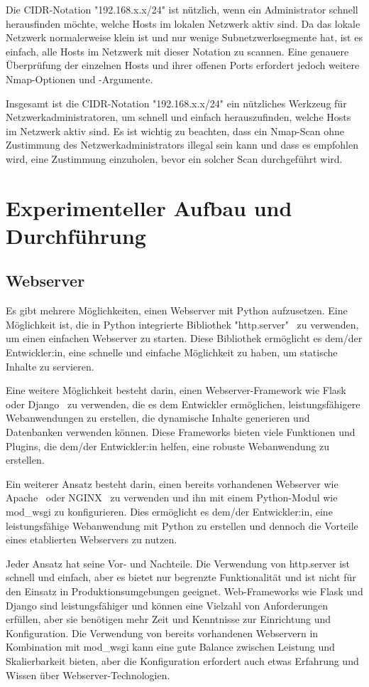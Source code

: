 \documentclass[12pt]{article}
\begin{document}
Die CIDR-Notation "192.168.x.x/24" ist nützlich, wenn ein Administrator schnell herausfinden möchte, welche Hosts im lokalen Netzwerk aktiv sind. Da das lokale Netzwerk normalerweise klein ist und nur wenige Subnetzwerksegmente hat, ist es einfach, alle Hosts im Netzwerk mit dieser Notation zu scannen. Eine genauere Überprüfung der einzelnen Hosts und ihrer offenen Ports erfordert jedoch weitere Nmap-Optionen und -Argumente.

Insgesamt ist die CIDR-Notation "192.168.x.x/24" ein nützliches Werkzeug für Netzwerkadministratoren, um schnell und einfach herauszufinden, welche Hosts im Netzwerk aktiv sind. Es ist wichtig zu beachten, dass ein Nmap-Scan ohne Zustimmung des Netzwerkadministrators illegal sein kann und dass es empfohlen wird, eine Zustimmung einzuholen, bevor ein solcher Scan durchgeführt wird.

\newpage
\section{Experimenteller Aufbau und Durchf\"uhrung}
\subsection{Webserver}

Es gibt mehrere Möglichkeiten, einen Webserver mit Python aufzusetzen. Eine Möglichkeit ist, die in Python integrierte Bibliothek "http.server"~\cite{http} zu verwenden, um einen einfachen Webserver zu starten. Diese Bibliothek ermöglicht es dem/der Entwickler:in, eine schnelle und einfache Möglichkeit zu haben, um statische Inhalte zu servieren.

Eine weitere Möglichkeit besteht darin, einen Webserver-Framework wie Flask~\cite{flask} oder Django~\cite{django} zu verwenden, die es dem Entwickler ermöglichen, leistungsfähigere Webanwendungen zu erstellen, die dynamische Inhalte generieren und Datenbanken verwenden können. Diese Frameworks bieten viele Funktionen und Plugins, die dem/der Entwickler:in helfen, eine robuste Webanwendung zu erstellen.

Ein weiterer Ansatz besteht darin, einen bereits vorhandenen Webserver wie Apache~\cite{apache} oder NGINX~\cite{nginx} zu verwenden und ihn mit einem Python-Modul wie mod\_wsgi zu konfigurieren. Dies ermöglicht es dem/der Entwickler:in, eine leistungsfähige Webanwendung mit Python zu erstellen und dennoch die Vorteile eines etablierten Webservers zu nutzen.

Jeder Ansatz hat seine Vor- und Nachteile. Die Verwendung von http.server ist schnell und einfach, aber es bietet nur begrenzte Funktionalität und ist nicht für den Einsatz in Produktionsumgebungen geeignet. Web-Frameworks wie Flask und Django sind leistungsfähiger und können eine Vielzahl von Anforderungen erfüllen, aber sie benötigen mehr Zeit und Kenntnisse zur Einrichtung und Konfiguration. Die Verwendung von bereits vorhandenen Webservern in Kombination mit mod\_wsgi kann eine gute Balance zwischen Leistung und Skalierbarkeit bieten, aber die Konfiguration erfordert auch etwas Erfahrung und Wissen über Webserver-Technologien.
\end{document}
